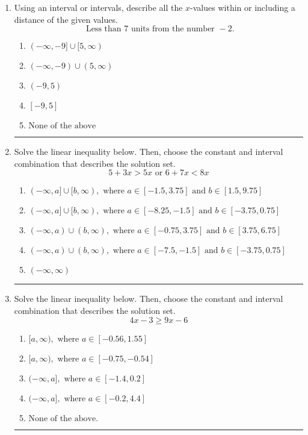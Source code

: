 \documentclass[14pt]{extbook}
\newcommand{\litem}[1]{\item#1\hspace*{-1cm}\rule{\textwidth}{0.4pt}}
\begin{document}
\begin{enumerate}
{\begin{enumerate}[label=\Alph*.]
\end{enumerate} }
\litem{
Using an interval or intervals, describe all the $x$-values within or including a distance of the given values.\[ \text{ Less than } 7 \text{ units from the number } -2. \]\begin{enumerate}[label=\Alph*.]
\item \( (-\infty, -9] \cup [5, \infty) \)
\item \( (-\infty, -9) \cup (5, \infty) \)
\item \( (-9, 5) \)
\item \( [-9, 5] \)
\item \( \text{None of the above} \)

\end{enumerate} }
\litem{
Solve the linear inequality below. Then, choose the constant and interval combination that describes the solution set.\[ 5 + 3 x > 5 x \text{ or } 6 + 7 x < 8 x \]\begin{enumerate}[label=\Alph*.]
\item \( (-\infty, a] \cup [b, \infty), \text{ where } a \in [-1.5, 3.75] \text{ and } b \in [1.5, 9.75] \)
\item \( (-\infty, a] \cup [b, \infty), \text{ where } a \in [-8.25, -1.5] \text{ and } b \in [-3.75, 0.75] \)
\item \( (-\infty, a) \cup (b, \infty), \text{ where } a \in [-0.75, 3.75] \text{ and } b \in [3.75, 6.75] \)
\item \( (-\infty, a) \cup (b, \infty), \text{ where } a \in [-7.5, -1.5] \text{ and } b \in [-3.75, 0.75] \)
\item \( (-\infty, \infty) \)

\end{enumerate} }
\litem{
Solve the linear inequality below. Then, choose the constant and interval combination that describes the solution set.\[ 4x -3 \geq 9x -6 \]\begin{enumerate}[label=\Alph*.]
\item \( [a, \infty), \text{ where } a \in [-0.56, 1.55] \)
\item \( [a, \infty), \text{ where } a \in [-0.75, -0.54] \)
\item \( (-\infty, a], \text{ where } a \in [-1.4, 0.2] \)
\item \( (-\infty, a], \text{ where } a \in [-0.2, 4.4] \)
\item \( \text{None of the above}. \)


\end{enumerate}}
\end{enumerate}
\end{document}
